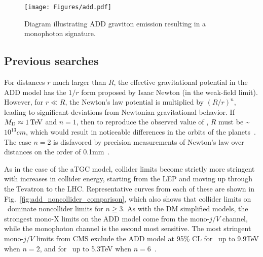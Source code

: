 \begin{figure}[hbtp]
  \begin{center}
    \texttt{[image: Figures/add.pdf]}
    \caption{
      Diagram illustrating ADD graviton emission resulting in a monophoton signature.
    }
    \label{fig:add_diagram}
  \end{center}
\end{figure}

\subsection{Previous searches} \label{sec:introduction_ADD_previous_searches}
For distances $r$ much larger than $R$, the effective gravitational potential in the ADD model has the $1/r$ form proposed by Isaac Newton (in the weak-field limit).
However, for $r \ll R$, the Newton's law potential is multiplied by $(R/r)^{n}$, leading to significant deviations from Newtonian gravitational behavior.
If $\mD \approx 1\unit{TeV}$ and $n = 1$, then to reproduce the observed value of \mPl, $R$ must be \textasciitilde$10^{13}\unit{cm}$, which
would result in noticeable differences in the orbits of the planets~\cite{ref:S0370-2693(98)00466-3}. The case $n = 2$ is disfavored by precision
measurements of Newton's law over distances on the order of 0.1\unit{mm}~\cite{ref:0264-9381/32/3/033001}.

As in the case of the aTGC model, collider limits
become strictly more stringent with increases in collider energy, starting from the LEP and moving up through the Tevatron to the LHC.
Representative curves from each of these are shown in Fig.~\ref{fig:add_noncollider_comparison}, which also shows that collider limits
on \mD\ dominate noncollider limits for $n \geq 3$. As with the DM simplified models, the strongest mono-X limits on the ADD model come from
the mono-$j/V$ channel, while the monophoton channel is the second most sensitive. The most stringent mono-$j/V$ limits from CMS exclude the ADD model
at 95\% CL for \mD\ up to 9.9\unit{TeV} when $n = 2$, and for \mD\ up to 5.3\unit{TeV} when $n = 6$~\cite{ref:PhysRevD.97.092005}.

